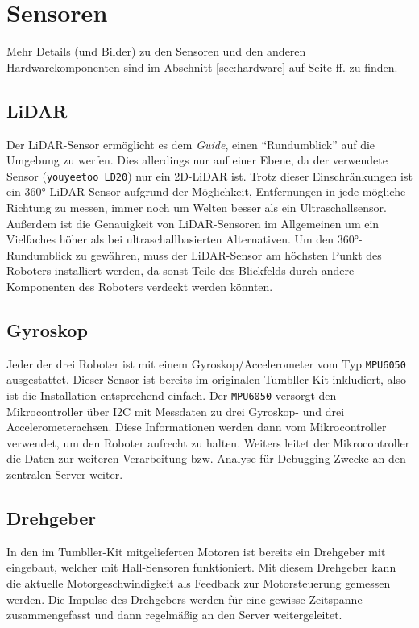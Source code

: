 \section{Sensoren}
\label{subsec:ueberblick_sensors}
Mehr Details (und Bilder) zu den Sensoren und den anderen Hardwarekomponenten sind im
Abschnitt \ref{sec:hardware} auf Seite \pageref{sec:hardware} ff. zu finden.

\subsection{LiDAR}
\label{subsec:ueberblick_lidar}
Der LiDAR-Sensor ermöglicht es dem \textit{Guide},
einen ``Rundumblick'' auf die Umgebung zu werfen.
%
Dies allerdings nur auf einer Ebene,
da der verwendete Sensor (\texttt{youyeetoo LD20})
nur ein 2D-LiDAR ist.
%
Trotz dieser Einschränkungen ist ein 360° LiDAR-Sensor aufgrund der Möglichkeit,
Entfernungen in jede mögliche Richtung zu messen,
immer noch um Welten besser als ein Ultraschallsensor.
%
Außerdem ist die Genauigkeit von LiDAR-Sensoren im Allgemeinen
um ein Vielfaches höher als bei ultraschallbasierten Alternativen.
%
Um den 360°-Rundumblick zu gewähren,
muss der LiDAR-Sensor am höchsten Punkt des Roboters installiert werden,
da sonst Teile des Blickfelds
durch andere Komponenten des Roboters verdeckt werden könnten.

\subsection{Gyroskop}
Jeder der drei Roboter ist mit einem Gyroskop/Accelerometer vom Typ \texttt{MPU6050} ausgestattet.
%
Dieser Sensor ist bereits im originalen Tumbller-Kit inkludiert, also ist die Installation entsprechend einfach.
%
Der \texttt{MPU6050} versorgt den Mikrocontroller über I2C mit Messdaten zu drei Gyroskop- und drei Accelerometerachsen.
%
Diese Informationen werden dann vom Mikrocontroller verwendet, um den Roboter aufrecht zu halten.
%
Weiters leitet der Mikrocontroller die Daten zur weiteren Verarbeitung bzw. Analyse für Debugging-Zwecke an den zentralen Server weiter.

\subsection{Drehgeber}
\label{subsec:ueberblick_rot_enc}
In den im Tumbller-Kit mitgelieferten Motoren ist bereits ein Drehgeber mit eingebaut,
welcher mit Hall-Sensoren funktioniert.
%
Mit diesem Drehgeber kann die aktuelle Motorgeschwindigkeit als Feedback zur Motorsteuerung gemessen werden.
%
Die Impulse des Drehgebers werden für eine gewisse Zeitspanne zusammengefasst und dann regelmäßig an den Server weitergeleitet.